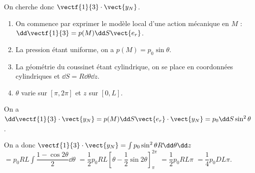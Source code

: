 \ifprof
\begin{corrige}
On cherche donc $\vectf{1}{3} \cdot \vect{y_N}$.
\begin{enumerate}
\item On commence par exprimer le modèle local d'une action mécanique en $M$ : $\dd \vectf{1}{3} = p(M) \dd S \vect{e_r}$.
\item La pression étant uniforme, on a $p(M)=p_0 \sin\theta$.
\item La géométrie du coussinet étant cylindrique, on se place en coordonnées cylindriques et $\dd S = R\dd \theta \dd z$.  
\item $\theta$ varie sur $[\pi, 2\pi]$ et $z$ sur $[0,L]$. 
\end{enumerate}

On a  $\dd \vectf{1}{3} \cdot \vect{y_N} = p(M) \dd S \vect{e_r} \cdot \vect{y_N} =p_0 \dd S  \sin^2 \theta $. 

On a donc $\vectf{1}{3} \cdot \vect{y_N} = \int  p_0  \sin^2 \theta  R\dd \theta \dd z $
$ =   p_0 R L \int \dfrac{1-\cos 2\theta }{2}   \dd \theta$
$ =   \dfrac{1}{2}p_0 R L \left[\theta-\dfrac{1}{2}\sin 2\theta \right]^{2\pi}_{\pi} $
$ =   \dfrac{1}{2}p_0 R L {\pi} $
$ =   \dfrac{1}{4}p_0 D L {\pi} $.
\end{corrige}
\else
\fi

\ifcolle
\noindent\footnotesize
{}
\normalsize
\else

\fi



\ifprof
\else


\fi

